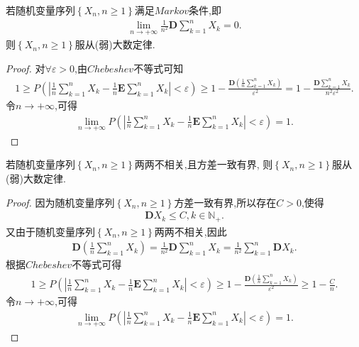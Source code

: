 \documentclass[lang=cn,newtx,10pt,scheme=chinese]{../../Template/elegantbook}
\begin{document}
\begin{theorem}[Markov大数定律]\label{theorem:Markov大数定律}
    若随机变量序列$\left\{ X_n,n\ge 1 \right\}$满足$Markov$条件,即
    \begin{align*}
        \underset{n\rightarrow +\infty}{\lim}\frac{1}{n^2}\boldsymbol{D}\sum_{k=1}^n{X_k}=0.
    \end{align*}
    则$\left\{ X_n,n\ge 1 \right\}$服从(弱)大数定律.
\end{theorem}
\begin{proof}
    对$\forall \varepsilon>0$,由$Chebeshev$不等式可知
    \begin{align*}
        1\geqslant P\left( \left| \frac{1}{n}\sum_{k=1}^n{X_k}-\frac{1}{n}\boldsymbol{E}\sum\limits_{k=1}^n{X_k} \right|<\varepsilon \right) \geqslant 1-\frac{\boldsymbol{D}\left( \frac{1}{n}\sum\limits_{k=1}^n{X_k} \right)}{\varepsilon ^2}=1-\frac{\boldsymbol{D}\sum\limits_{k=1}^n{X_k}}{n^2\varepsilon ^2}.
    \end{align*}
    令$n\to +\infty$,可得
    \begin{align*}
        \underset{n\rightarrow +\infty}{\lim}P\left( \left| \frac{1}{n}\sum_{k=1}^n{X_k}-\frac{1}{n}\boldsymbol{E}\sum_{k=1}^n{X_k} \right|<\varepsilon \right) =1.
    \end{align*}

\end{proof}

\begin{theorem}[Chebeshev大数定律]\label{theorem:Chebeshev大数定律}
    若随机变量序列$\left\{ X_n,n\ge 1 \right\}$两两不相关,且方差一致有界,
    则$\left\{ X_n,n\ge 1 \right\}$服从(弱)大数定律.
\end{theorem}
\begin{proof}
    因为随机变量序列$\left\{ X_n,n\ge 1 \right\}$方差一致有界,所以存在$C>0$,使得
    \begin{align*}
        \boldsymbol{D}X_k\leqslant C,k\in \mathbb{N}_+.
    \end{align*}
    又由于随机变量序列$\left\{ X_n,n\ge 1 \right\}$两两不相关,因此
    \begin{align*}
        \boldsymbol{D}\left( \frac{1}{n}\sum_{k=1}^n{X_k} \right) =\frac{1}{n^2}\boldsymbol{D}\sum_{k=1}^n{X_k}=\frac{1}{n^2}\sum_{k=1}^n{\boldsymbol{D}X_k}.
    \end{align*}
    根据$Chebeshev$不等式可得
    \begin{align*}
        1\geqslant P\left( \left| \frac{1}{n}\sum_{k=1}^n{X_k}-\frac{1}{n}\boldsymbol{E}\sum_{k=1}^n{X_k} \right|<\varepsilon \right) \geqslant 1-\frac{\boldsymbol{D}\left( \frac{1}{n}\sum\limits_{k=1}^n{X_k} \right)}{\varepsilon ^2}\geqslant 1-\frac{C}{n}.
    \end{align*}
    令$n\to +\infty$,可得
    \begin{align*}
        \underset{n\rightarrow +\infty}{\lim}P\left( \left| \frac{1}{n}\sum_{k=1}^n{X_k}-\frac{1}{n}\boldsymbol{E}\sum_{k=1}^n{X_k} \right|<\varepsilon \right) =1.
    \end{align*}

\end{proof}
\end{document}
